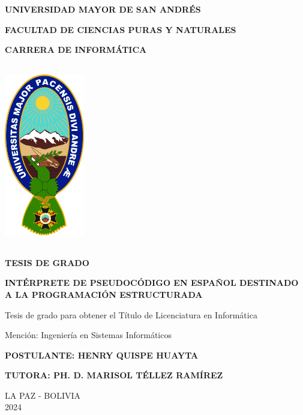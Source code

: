 \begin{titlepage}
  \centering
  {\fontsize{20}{0} \textbf{UNIVERSIDAD MAYOR DE SAN ANDRÉS}}\\
  {\fontsize{16}{0} \textbf{FACULTAD DE CIENCIAS PURAS Y NATURALES}\par}
  {\fontsize{16}{0} \textbf{CARRERA DE INFORMÁTICA}\par}
  \vspace{1cm}
  \includegraphics[height=8cm, width=3.5cm]{images/umsa.png}\par
  {\fontsize{12}{0} \textbf{TESIS DE GRADO}\par}
  {\fontsize{16}{0} \textbf{INTÉRPRETE DE PSEUDOCÓDIGO EN ESPAÑOL DESTINADO A LA PROGRAMACIÓN ESTRUCTURADA}\par}
  {\fontsize{11}{0} Tesis de grado para obtener el Título de Licenciatura en Informática\par}
  {\fontsize{11}{0} Mención: Ingeniería en Sistemas Informáticos\par}
  \vspace{1.5em}
  {\fontsize{14}{0} \textbf{POSTULANTE: \textnormal{HENRY QUISPE HUAYTA}}\par}
  {\fontsize{12}{0} \textbf{TUTORA: \textnormal{PH. D. MARISOL TÉLLEZ RAMÍREZ}}\par}
  \vspace{2em}
  {\fontsize{12}{0} LA PAZ - BOLIVIA\\ 2024\par}
\end{titlepage}